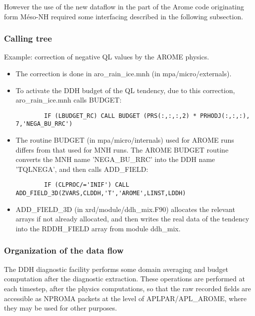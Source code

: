 However the use of the new dataflow in the part of the Arome code originating
form Méso-NH required some interfacing described in the following subsection.

\subsubsection{Calling tree}

Example: correction of negative QL values by the AROME physics.
\begin{itemize}
	\item The correction is done in aro\_rain\_ice.mnh (in mpa/micro/externals).
	\item To activate the DDH budget of the QL tendency, due to this correction,
		aro\_rain\_ice.mnh calls BUDGET:
		{\small \begin{verbatim}
		IF (LBUDGET_RC) CALL BUDGET (PRS(:,:,:,2) * PRHODJ(:,:,:), 7,'NEGA_BU_RRC')
		\end{verbatim}}
	\item The routine BUDGET (in mpa/micro/internals) used for AROME runs differs from that used for MNH runs.
		The AROME BUDGET routine converts the MNH name 'NEGA\_BU\_RRC'
		into the DDH name 'TQLNEGA', and then calls ADD\_FIELD:
		{\small \begin{verbatim}
		IF (CLPROC/='INIF') CALL ADD_FIELD_3D(ZVARS,CLDDH,'T','AROME',LINST,LDDH)
		\end{verbatim}}
	\item ADD\_FIELD\_3D (in xrd/module/ddh\_mix.F90) allocates the relevant arrays
		if not already allocated, and then writes the real data of the tendency
		into the RDDH\_FIELD array from module ddh\_mix.
\end{itemize}

\subsubsection{Organization of the data flow}

The DDH diagnostic facility performs some domain averaging and budget
computation after the diagnostic extraction. These operations are performed at
each timestep, after the physics computations, so that the raw recorded fields
are accessible as NPROMA packets at the level of APLPAR/APL\_AROME, where they
may be used for other purposes.

